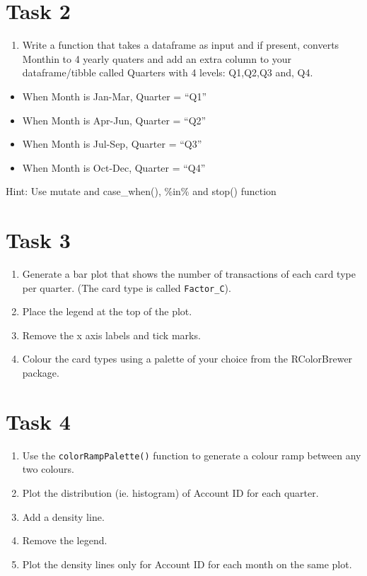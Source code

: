 \documentclass[
]{book}
\providecommand{\tightlist}{%
  \setlength{\itemsep}{0pt}\setlength{\parskip}{0pt}}
\begin{document}
\hypertarget{task-2}{%
\section{Task 2}\label{task-2}}

\begin{enumerate}
\def\labelenumi{\arabic{enumi}.}
\tightlist
\item
  Write a function that takes a dataframe as input and if present, converts Monthin to 4 yearly quaters and add an extra column to your dataframe/tibble called Quarters with 4 levels: Q1,Q2,Q3 and, Q4.
\end{enumerate}

\begin{itemize}
\tightlist
\item
  When Month is Jan-Mar, Quarter = ``Q1''
\item
  When Month is Apr-Jun, Quarter = ``Q2''
\item
  When Month is Jul-Sep, Quarter = ``Q3''
\item
  When Month is Oct-Dec, Quarter = ``Q4''
\end{itemize}

Hint: Use mutate and case\_when(), \%in\% and stop() function

\hypertarget{task-3}{%
\section{Task 3}\label{task-3}}

\begin{enumerate}
\def\labelenumi{\arabic{enumi}.}
\tightlist
\item
  Generate a bar plot that shows the number of transactions of each card type per quarter. (The card type is called \texttt{Factor\_C}).
\item
  Place the legend at the top of the plot.
\item
  Remove the x axis labels and tick marks.
\item
  Colour the card types using a palette of your choice from the RColorBrewer package.
\end{enumerate}

\hypertarget{task-4}{%
\section{Task 4}\label{task-4}}

\begin{enumerate}
\def\labelenumi{\arabic{enumi}.}
\tightlist
\item
  Use the \texttt{colorRampPalette()} function to generate a colour ramp between any two colours.
\item
  Plot the distribution (ie. histogram) of Account ID for each quarter.
\item
  Add a density line.
\item
  Remove the legend.
\item
  Plot the density lines only for Account ID for each month on the same plot.
\end{enumerate}
\end{document}
